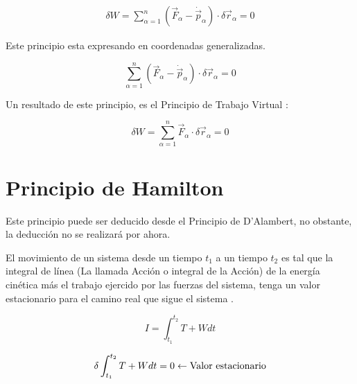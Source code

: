 \documentclass[/home/hernan/Documentos/Apuntes_mecanica_teorica/main.tex]{subfiles}
\begin{document}
    \begin{align*}
        \delta W = \sum_{\alpha=1}^{n} \left( \vec{F}_{\alpha} - \dot{\vec{p}}_{\alpha} \right) \cdot \delta \vec{r}_{\alpha} = 0
    \end{align*}

    \begin{definition} 
        Este principio esta expresando en coordenadas generalizadas.

        \begin{equation}
            \sum_{\alpha=1}^{n} \left( \vec{F}_{\alpha} - \dot{\vec{p}}_{\alpha}\right) \cdot \delta \vec{r}_{\alpha} = 0
            \label{eq: DAlambertP}
        \end{equation}
        
    \end{definition}

    Un resultado de este principio, es el Principio de Trabajo Virtual :

        \begin{equation*}
            \delta W = \sum_{\alpha=1}^{n} \vec{F}_{\alpha}  \cdot \delta \vec{r}_{\alpha} = 0
        \end{equation*}



    \section{Principio de Hamilton}

    Este principio puede ser deducido desde el Principio de D'Alambert, no obstante, la deducción no se realizará por ahora.

    \begin{definition}
        El movimiento de un sistema desde un tiempo $t_1$ a un tiempo $t_2$ es tal que la integral de línea (La llamada Acción o integral de la Acción) de la energía cinética más el trabajo ejercido por las fuerzas del sistema, tenga un valor estacionario para el camino real que sigue el sistema .

        \begin{equation}
            I = \int_{t_1}^{t_2} T + W dt 
            \label{eq: PHamiltonE}
        \end{equation}

        \begin{equation*}
            \delta \int_{t_1}^{t_2} T + W dt = 0 \leftarrow \textup{Valor estacionario}
        \end{equation*}

    \end{definition}
\end{document}
